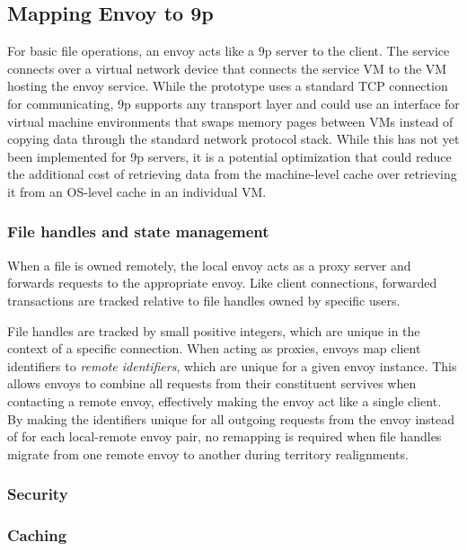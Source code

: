 \subsection{Mapping Envoy to 9p}

For basic file operations, an envoy acts like a 9p server to the client. The service connects over a virtual network device that connects the service VM to the VM hosting the envoy service. While the prototype uses a standard TCP connection for communicating, 9p supports any transport layer and could use an interface for virtual machine environments that swaps memory pages between VMs instead of copying data through the standard network protocol stack. While this has not yet been implemented for 9p servers, it is a potential optimization that could reduce the additional cost of retrieving data from the machine-level cache over retrieving it from an OS-level cache in an individual VM.

\subsubsection{File handles and state management}

When a file is owned remotely, the local envoy acts as a proxy server and forwards requests to the appropriate envoy. Like client connections, forwarded transactions are tracked relative to file handles owned by specific users.

File handles are tracked by small positive integers, which are unique in the context of a specific connection. When acting as proxies, envoys map client identifiers to \emph{remote identifiers}, which are unique for a given envoy instance. This allows envoys to combine all requests from their constituent servives when contacting a remote envoy, effectively making the envoy act like a single client. By making the identifiers unique for all outgoing requests from the envoy instead of for each local-remote envoy pair, no remapping is required when file handles migrate from one remote envoy to another during territory realignments.

\subsubsection{Security}

\subsubsection{Caching}

